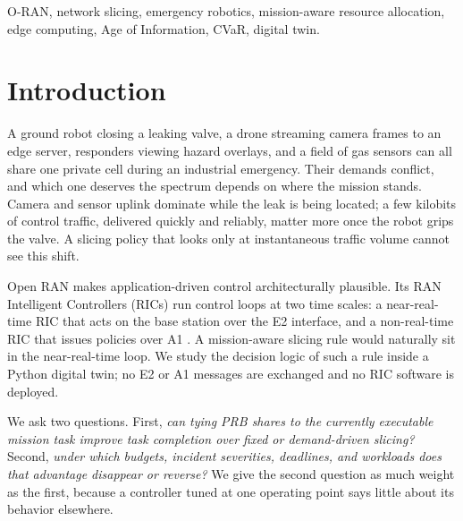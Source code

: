\documentclass[conference]{IEEEtran}
\begin{document}
\begin{IEEEkeywords}
O-RAN, network slicing, emergency robotics, mission-aware resource allocation, edge computing, Age of Information, CVaR, digital twin.
\end{IEEEkeywords}

\section{Introduction}
A ground robot closing a leaking valve, a drone streaming camera frames to an edge server, responders viewing hazard overlays, and a field of gas sensors can all share one private cell during an industrial emergency. Their demands conflict, and which one deserves the spectrum depends on where the mission stands. Camera and sensor uplink dominate while the leak is being located; a few kilobits of control traffic, delivered quickly and reliably, matter more once the robot grips the valve. A slicing policy that looks only at instantaneous traffic volume cannot see this shift.

Open RAN makes application-driven control architecturally plausible. Its RAN Intelligent Controllers (RICs) run control loops at two time scales: a near-real-time RIC that acts on the base station over the E2 interface, and a non-real-time RIC that issues policies over A1 \cite{oranarch,oranwg3,polese}. A mission-aware slicing rule would naturally sit in the near-real-time loop. We study the decision logic of such a rule inside a Python digital twin; no E2 or A1 messages are exchanged and no RIC software is deployed.

We ask two questions. First, \emph{can tying PRB shares to the currently executable mission task improve task completion over fixed or demand-driven slicing?} Second, \emph{under which budgets, incident severities, deadlines, and workloads does that advantage disappear or reverse?} We give the second question as much weight as the first, because a controller tuned at one operating point says little about its behavior elsewhere.
\end{document}
